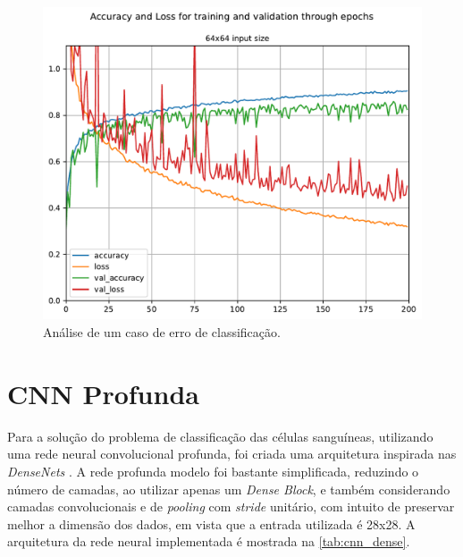 \begin{figure}[H]
	\centering
	\includegraphics[width=0.75\linewidth]{../../plot/cnn_shallow/64x64_model_training}
	\caption{Análise de um caso de erro de classificação.}
	\label{fig:64x64_model_training}
\end{figure}


\clearpage
\section{CNN Profunda}

Para a solução do problema de classificação das células sanguíneas, utilizando uma rede neural convolucional profunda, foi criada uma arquitetura inspirada nas \textit{DenseNets} \cite{huang2018densely}. A rede profunda modelo foi bastante simplificada, reduzindo o número de camadas, ao utilizar apenas um \textit{Dense Block}, e também considerando camadas convolucionais e de \textit{pooling} com \textit{stride} unitário, com intuito de preservar melhor a dimensão dos dados, em vista que a entrada utilizada é 28x28. A arquitetura da rede neural implementada é mostrada na \autoref{tab:cnn_dense}.

